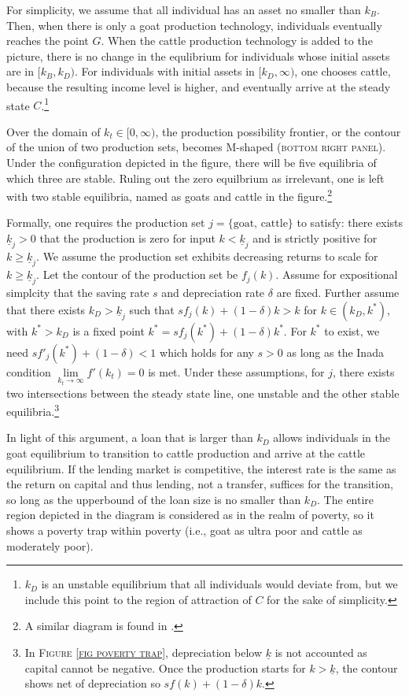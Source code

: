 	For simplicity, we assume that all individual has an asset no smaller than $k_{B}$. Then, when there is only a goat production technology, individuals eventually reaches the point $G$. When the cattle production technology is added to the picture, there is no change in the equlibrium for individuals whose initial assets are in $[k_{B}, k_{D})$. For individuals with initial assets in $[k_{D}, \infty)$, one chooses cattle, because the resulting income level is higher, and eventually arrive at the steady state $C$.\footnote{$k_{D}$ is an unstable equilibrium that all individuals would deviate from, but we include this point to the region of attraction of $C$ for the sake of simplicity. } 

	Over the domain of $k_{t}\in[0, \infty)$, the production possibility frontier, or the contour of the union of two production sets, becomes M-shaped (\textsc{bottom right panel}). Under the configuration depicted in the figure, there will be five equilibria of which three are stable. Ruling out the zero equilbrium as irrelevant, one is left with two stable equilibria, named as goats and cattle in the figure.\footnote{A similar diagram is found in \citet[][Figure 3, with $k-y$ space]{KraayMcKenzie2014}. }

	Formally, one requires the production set $j=\{\mbox{goat, cattle}\}$ to satisfy: there exists $\underline{k}_{j}>0$ that the production is zero for input $k<\underline{k}_{j}$ and is strictly positive for $k\geqslant\underline{k}_{j}$. We assume the production set exhibits decreasing returns to scale for $k\geqslant\underline{k}_{j}$. Let the contour of the production set be $f_{j}(k)$. Assume for expositional simplcity that the saving rate $s$ and depreciation rate $\delta$ are fixed. Further assume that there exists $k_{D}>\underline{k}_{j}$ such that $sf_{j}(k)+(1-\delta)k>k$ for $k\in(k_{D}, k^{*})$, with $k^{*}>k_{D}$ is a fixed point $k^{*}=sf_{j}(k^{*})+(1-\delta)k^{*}$. For $k^{*}$ to exist, we need $sf'_{j}(k^{*})+(1-\delta)<1$ which holds for any $s>0$ as long as the Inada condition $\lim\limits_{k_{t}\rightarrow \infty} f'(k_{t})=0$ is met. Under these assumptions, for $j$, there exists two intersections between the steady state line, one unstable and the other stable equilibria.\footnote{In \textsc{Figure \ref{fig poverty trap}}, depreciation below $\underline{k}$ is not accounted as capital cannot be negative. Once the production starts for $k>\underline{k}$, the contour shows net of depreciation so $sf(k)+(1-\delta)k$. } 

	In light of this argument, a loan that is larger than $k_{D}$ allows individuals in the goat equilibrium to transition to cattle production and arrive at the cattle equilibrium. If the lending market is competitive, the interest rate is the same as the return on capital and thus lending, not a transfer, suffices for the transition, so long as the upperbound of the loan size is no smaller than $k_{D}$. The entire region depicted in the diagram is considered as in the realm of poverty, so it shows a poverty trap within poverty (i.e., goat as ultra poor and cattle as moderately poor). 
	

